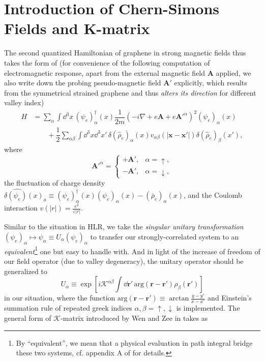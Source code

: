\documentclass[bachelor,english,numbers]{ustcthesis}
\begin{document}
	\section{Introduction of Chern-Simons Fields and K-matrix}
		\indent\par
		The second quantized Hamiltonian of graphene in strong magnetic fields thus takes the form of (for convenience of the following computation of electromagnetic response, apart from the external magnetic field $\bm{A}$ applied, we also write down the probing pseudo-magnetic field $\bm{A'}$ explicitly, which results from the symmetrical strained graphene and thus \emph{alters its direction} for different valley index)
		\begin{align}\label{2.1.1}
			H&=\sum_\alpha\int\dd^3x\,(\psi_e)^\dagger_\alpha(x)\dfrac{1}{2m}\left(-i\nabla+e\bm{A}+e\bm{A'}^\alpha\right)^2(\psi_e)_\alpha(x)\nonumber\\
			&\qquad+\dfrac{1}{2}\sum_{\alpha \beta}\int\dd^3x\dd^3x'\,\delta(\hat{\rho}_e)_\alpha(x)v_{\alpha \beta}(|\bm{x}-\bm{x'}|)\delta(\hat{\rho}_e)_\beta(x'),
		\end{align}
		where 
		\begin{equation*}
			\bm{A'}^\alpha=\begin{cases}
				+\bm{A'},&\alpha=\uparrow,\\
				-\bm{A'},&\alpha=\downarrow,
			\end{cases}
		\end{equation*}
		the fluctuation of charge density $\delta\hat{(\psi_e)}(x)_a\equiv(\psi_e)^\dagger_\alpha(x)(\psi_e)_\alpha(x)-(\bar{\rho}_e)_\alpha(x)$, and the Coulomb interaction $v(|r|)=\frac{e^2}{\varepsilon |r|}$.
		\indent\par Similar to the situation in HLR, we take the \emph{singular unitary transformation} $(\psi_e)_\alpha\mapsto\psi_\alpha\equiv U_\alpha(\psi_e)_\alpha$ to transfer our strongly-correlated system to an \emph{equivalent}\footnote{By ``equivalent'', we mean that a physical evaluation in path integral bridge these two systems, cf. appendix A of \cite{lopez1991fractional} for details.} one but easy to handle with. And in light of the increase of freedom of our field operator (due to valley degeneracy), the unitary operator should be generalized to 
		\begin{equation}\label{2.2.1}
			U_\alpha\equiv\exp \left[i\mathcal{K}^{\alpha \beta}\int\dd\bm{r'}\,\mathrm{arg}(\bm{r}-\bm{r'})\rho_\beta(\bm{r'}) \right]
		\end{equation}
		in our situation, where the function $\mathrm{arg}(\bm{r}-\bm{r'})\equiv\arctan\frac{y-y'}{x-x'}$ and Einstein's summation rule of repeated greek indices $\alpha,\beta=\uparrow,\downarrow$ is implemented. The general form of $\mathcal{K}$-matrix introduced by Wen and Zee in \cite{wen1992classification} takes as \cite{mandal1996theory}
\end{document}
